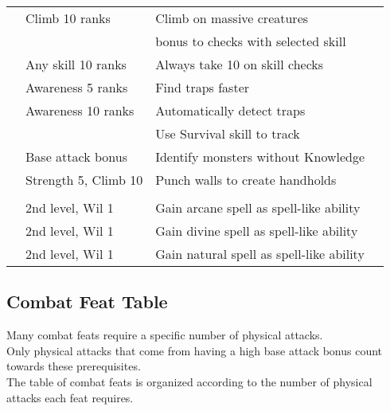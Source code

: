 \begin{longtabuwrapper}
\begin{longtabu}{>{\lcol}p{10em} >{\lcol}p{15em} >{\lcol}X >{\lcol}p{3em}}
         & Climb 10 ranks & Climb on massive creatures &  \\
         & \x &   bonus to checks with selected skill &  \\
         & Any skill 10 ranks & Always take 10 on skill checks &  \\
         & Awareness 5 ranks & Find traps faster &  \\
         & Awareness 10 ranks & Automatically detect traps &  \\
         & \x &  Use Survival skill to track &  \\
         & Base attack bonus  & Identify monsters without Knowledge &  \\
         & Strength 5, Climb 10 & Punch walls to create handholds &  \\

        \midrule
         &  &  &  \\
         & 2nd level, Wil 1 & Gain arcane spell as spell-like ability &  \\
         & 2nd level, Wil 1 & Gain divine spell as spell-like ability &  \\
         & 2nd level, Wil 1 & Gain natural spell as spell-like ability &  \\

    \end{longtabu}
\end{longtabuwrapper}

\subsection{Combat Feat Table}\label{cap:Combat Feats}

Many combat feats require a specific number of physical attacks.\\
Only physical attacks that come from having a high base attack bonus count towards these prerequisites.\\
The table of combat feats is organized according to the number of physical attacks each feat requires.\\

